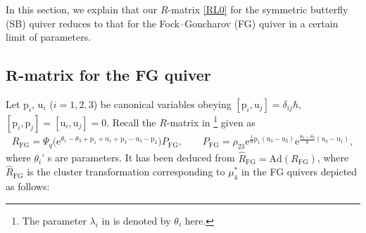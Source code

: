 \documentclass[pdftex]{sigma}
\newcommand{\e}{{\mathrm e}}
\numberwithin{equation}{section}
\begin{document}
In this section, we explain that our $R$-matrix \eqref{RL0} for the symmetric butterfly (SB) quiver
reduces to that for the Fock--Goncharov (FG) quiver \cite{IKT1} in a certain limit of parameters.

\subsection[R-matrix for the FG quiver]{$\boldsymbol{R}$-matrix for the FG quiver}

Let $\mathrm{p}_i$, $\mathrm{u}_i$ ($i=1, 2, 3$) be canonical
variables obeying $[\mathrm{p}_i, \mathrm{u}_j] = \delta_{ij}\hbar$,
$[\mathrm{p}_i, \mathrm{p}_j] = [\mathrm{u}_i, \mathrm{u}_j] =0$.
Recall the $R$-matrix in \cite[equation~(4.14)]{IKT1}\footnote{The
 parameter $\lambda_i$ in \cite[equation~(3.5)]{IKT1} is denoted by
 $\theta_i$ here.} given as
\begin{align}\label{rfg}
R_\mathrm{FG} =
\Psi_q\bigl(\e^{\theta_1-\theta_3+\mathrm{p}_1+\mathrm{u}_1+\mathrm{p}_3
-\mathrm{u}_3-\mathrm{p}_2}\bigr) P_\mathrm{FG},
\qquad
P_\mathrm{FG} = \rho_{23}\e^{\tfrac{1}{\hbar}\mathrm{p}_1(\mathrm{u}_3-\mathrm{u}_2)}
\e^{\tfrac{\theta_2-\theta_3}{\hbar}(\mathrm{u}_3-\mathrm{u}_1)},
\end{align}
where $\theta_i$' s are parameters.
%
It has been deduced from
$\hat{R}_\mathrm{FG} = \mathrm{Ad}(R_\mathrm{FG})$,
where $\hat{R}_\mathrm{FG} $ is the cluster transformation
corresponding to $\mu^\ast_4$ in the
FG quivers depicted as follows:
\end{document}
